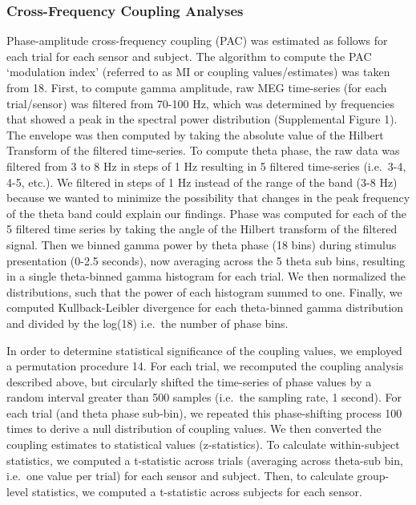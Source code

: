 \subsubsection{Cross-Frequency Coupling
Analyses}\label{cross-frequency-coupling-analyses}

Phase-amplitude cross-frequency coupling (PAC) was estimated as follows
for each trial for each sensor and subject. The algorithm to compute the
PAC `modulation index' (referred to as MI or coupling values/estimates)
was taken from 18. First, to compute gamma amplitude, raw MEG
time-series (for each trial/sensor) was filtered from 70-100 Hz, which
was determined by frequencies that showed a peak in the spectral power
distribution (Supplemental Figure 1). The envelope was then computed by
taking the absolute value of the Hilbert Transform of the filtered
time-series. To compute theta phase, the raw data was filtered from 3 to
8 Hz in steps of 1 Hz resulting in 5 filtered time-series (i.e.~3-4,
4-5, etc.). We filtered in steps of 1 Hz instead of the range of the
band (3-8 Hz) because we wanted to minimize the possibility that changes
in the peak frequency of the theta band could explain our findings.
Phase was computed for each of the 5 filtered time series by taking the
angle of the Hilbert transform of the filtered signal. Then we binned
gamma power by theta phase (18 bins) during stimulus presentation (0-2.5
seconds), now averaging across the 5 theta sub bins, resulting in a
single theta-binned gamma histogram for each trial. We then normalized
the distributions, such that the power of each histogram summed to one.
Finally, we computed Kullback-Leibler divergence for each theta-binned
gamma distribution and divided by the log(18) i.e.~the number of phase
bins.

In order to determine statistical significance of the coupling values,
we employed a permutation procedure 14. For each trial, we recomputed
the coupling analysis described above, but circularly shifted the
time-series of phase values by a random interval greater than 500
samples (i.e.~the sampling rate, 1 second). For each trial (and theta
phase sub-bin), we repeated this phase-shifting process 100 times to
derive a null distribution of coupling values. We then converted the
coupling estimates to statistical values (z-statistics). To calculate
within-subject statistics, we computed a t-statistic across trials
(averaging across theta-sub bin, i.e.~one value per trial) for each
sensor and subject. Then, to calculate group-level statistics, we
computed a t-statistic across subjects for each sensor.

